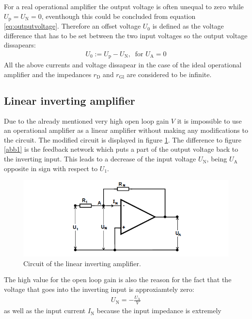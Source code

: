 \noindent For a real operational amplifier the output voltage is often unequal to zero while
$U_{\text{p}} = U_{\text{N}} = 0$, eventhough this could be concluded from equation
\ref{eq:outputvoltage}.
Therefore an offset voltage $U_0$ is defined as the voltage difference that has to
be set between the two input voltages so the output voltage dissapears:
\begin{align*}
    U_0 := U_{\text{p}} - U_{\text{N}} ,~ \text{ for } U_{\text{A}}=0
\end{align*}
All the above currents and voltage dissapear in the case of the ideal operational
amplifier and the impedances $r_{\text{D}}$ and $r_{\text{Gl}}$ are considered to
be infinite.

\subsection{Linear inverting amplifier}
Due to the already mentioned very high open loop gain $V$ it is impossible to use
an operational amplifier as a linear amplifier without making any modifications to
the circuit. The modified circuit is displayed in figure \ref{abb3}. The difference
to figure \ref{abb1} is the feedback network which puts a part of the output
voltage back to the inverting input. This leads to a decrease of the input voltage $U_{\text{N}}$, being $U_{\text{A}}$ opposite in sign with respect to $U_{1}$.
\FloatBarrier
\begin{figure}
  \centering
  \includegraphics[scale=0.5]{degenerative.PNG}
  \caption{Circuit of the linear inverting amplifier. \cite{Q1}}
  \label{abb3}
\end{figure}
\FloatBarrier
The high value for the open loop gain is also the reason for the fact that the
voltage that goes into the inverting input is approxiamtely zero:
\begin{align*}
    U_{\text{N}} = - \frac{U_{\text{A}}}{V}
\end{align*}
as well as the input current $I_{\text{N}}$ because the input impedance is extremely
